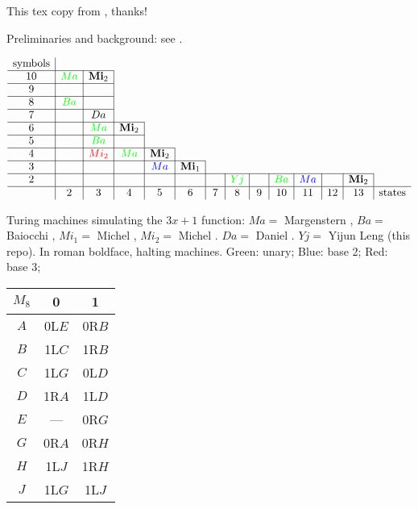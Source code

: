 \documentclass[10pt]{article}
\date{Feburary 23, 2025}
\begin{document}
This tex copy from \cite{Mi14}, thanks!

Preliminaries and background: see \cite{Mi14}.

\begin{table}
$$\begin{array}{c|c|c|c|c|c|c|c|c|c|c|c|c|c}
\mbox{symbols} & \multicolumn{13}{c}{}\\                                                \cline{1-3}
10             & \textcolor{green}{Ma}    & \mbox{\bf Mi}_2& \multicolumn{11}{c}{}\\                       \cline{1-3}
9              &       &      &\multicolumn{11}{c}{}\\                                  \cline{1-3}
8              & \textcolor{green}{Ba}    &      &\multicolumn{11}{c}{}\\                                  \cline{1-3}
7              &       & Da   			 &\multicolumn{11}{c}{}\\                                  \cline{1-4}
6              &       & \textcolor{green}{Ma}   &  \mbox{\bf Mi}_2 & \multicolumn{10}{c}{}\\          \cline{1-4}
5              &       & \textcolor{green}{Ba}   &                  & \multicolumn{10}{c}{}\\          \cline{1-5}
4              &       & \textcolor{red}{Mi_2} & \textcolor{green}{Ma}               &\mbox{\bf Mi}_2 & \multicolumn{9}{c}{}\\         \cline{1-6}
3              &       &      &                  & \textcolor{blue}{Ma}   &\mbox{\bf Mi}_1 & \multicolumn{8}{c}{}\\  \cline{1-13}
2              &       &      &    &      &      &     & \textcolor{green}{Yj}   &   & \textcolor{green}{Ba}  & \textcolor{blue}{Ma} & & \mbox{\bf Mi}_2\\  \hline
               & 2     & 3    & 4  & 5    &\,6\, &\,7\,&\,8\,&\,9\,& 10  & 11 & 12 & 13 & \mbox{states}
\end{array}$$
\caption{Turing machines simulating the $3x + 1$ function:
$Ma=$ Margenstern \cite{Ma98,Ma00},
$Ba=$ Baiocchi \cite{Ba98},
$Mi_1=$ Michel \cite{Mi93},
$Mi_2=$ Michel \cite{Mi14}.
$Da=$ Daniel \cite{Da24}.
$Yj=$ Yijun Leng (this repo).
In roman boldface, halting machines.
Green: unary;
Blue: base 2;
Red: base 3;
}
\end{table}


\begin{center}
\begin{tabular}{|c|c|c|}
\hline
$M_8$ &  0  &   1   \\
\hline
$A$ & 0L$E$ & 0R$B$ \\
\hline
$B$ & 1L$C$ & 1R$B$ \\
\hline
$C$ & 1L$G$ & 0L$D$ \\
\hline
$D$ & 1R$A$ & 1L$D$ \\
\hline
$E$ & ---   & 0R$G$ \\
\hline
$G$ & 0R$A$ & 0R$H$ \\
\hline
$H$ & 1L$J$ & 1R$H$ \\
\hline
$J$ & 1L$G$ & 1L$J$ \\
\hline
\end{tabular}
\end{center}
\end{document}

